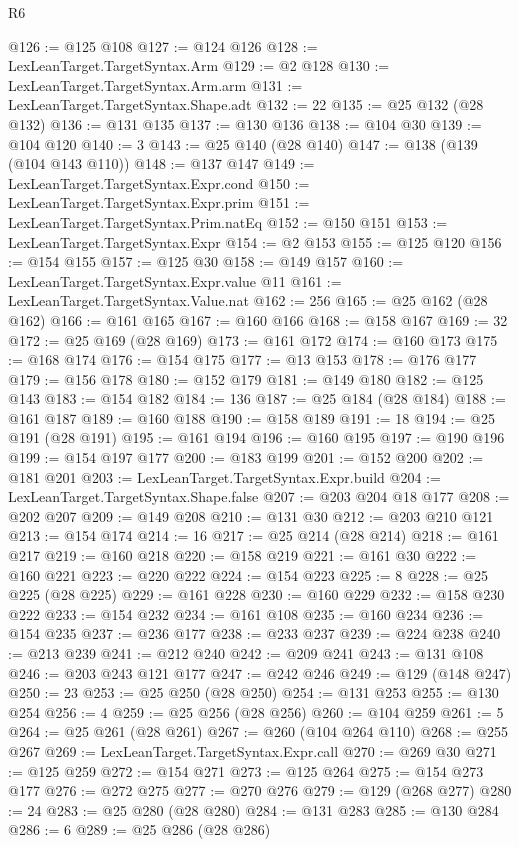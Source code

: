 \begin{lexlean}{R6}
\begin{coremodule}
@126 := @125 @108
@127 := @124 @126
@128 := LexLeanTarget.TargetSyntax.Arm
@129 := @2 @128
@130 := LexLeanTarget.TargetSyntax.Arm.arm
@131 := LexLeanTarget.TargetSyntax.Shape.adt
@132 := 22
@135 := @25 @132 (@28 @132)
@136 := @131 @135
@137 := @130 @136
@138 := @104 @30
@139 := @104 @120
@140 := 3
@143 := @25 @140 (@28 @140)
@147 := @138 (@139 (@104 @143 @110))
@148 := @137 @147
@149 := LexLeanTarget.TargetSyntax.Expr.cond
@150 := LexLeanTarget.TargetSyntax.Expr.prim
@151 := LexLeanTarget.TargetSyntax.Prim.natEq
@152 := @150 @151
@153 := LexLeanTarget.TargetSyntax.Expr
@154 := @2 @153
@155 := @125 @120
@156 := @154 @155
@157 := @125 @30
@158 := @149 @157
@160 := LexLeanTarget.TargetSyntax.Expr.value @11
@161 := LexLeanTarget.TargetSyntax.Value.nat
@162 := 256
@165 := @25 @162 (@28 @162)
@166 := @161 @165
@167 := @160 @166
@168 := @158 @167
@169 := 32
@172 := @25 @169 (@28 @169)
@173 := @161 @172
@174 := @160 @173
@175 := @168 @174
@176 := @154 @175
@177 := @13 @153
@178 := @176 @177
@179 := @156 @178
@180 := @152 @179
@181 := @149 @180
@182 := @125 @143
@183 := @154 @182
@184 := 136
@187 := @25 @184 (@28 @184)
@188 := @161 @187
@189 := @160 @188
@190 := @158 @189
@191 := 18
@194 := @25 @191 (@28 @191)
@195 := @161 @194
@196 := @160 @195
@197 := @190 @196
@199 := @154 @197 @177
@200 := @183 @199
@201 := @152 @200
@202 := @181 @201
@203 := LexLeanTarget.TargetSyntax.Expr.build
@204 := LexLeanTarget.TargetSyntax.Shape.false
@207 := @203 @204 @18 @177
@208 := @202 @207
@209 := @149 @208
@210 := @131 @30
@212 := @203 @210 @121
@213 := @154 @174
@214 := 16
@217 := @25 @214 (@28 @214)
@218 := @161 @217
@219 := @160 @218
@220 := @158 @219
@221 := @161 @30
@222 := @160 @221
@223 := @220 @222
@224 := @154 @223
@225 := 8
@228 := @25 @225 (@28 @225)
@229 := @161 @228
@230 := @160 @229
@232 := @158 @230 @222
@233 := @154 @232
@234 := @161 @108
@235 := @160 @234
@236 := @154 @235
@237 := @236 @177
@238 := @233 @237
@239 := @224 @238
@240 := @213 @239
@241 := @212 @240
@242 := @209 @241
@243 := @131 @108
@246 := @203 @243 @121 @177
@247 := @242 @246
@249 := @129 (@148 @247)
@250 := 23
@253 := @25 @250 (@28 @250)
@254 := @131 @253
@255 := @130 @254
@256 := 4
@259 := @25 @256 (@28 @256)
@260 := @104 @259
@261 := 5
@264 := @25 @261 (@28 @261)
@267 := @260 (@104 @264 @110)
@268 := @255 @267
@269 := LexLeanTarget.TargetSyntax.Expr.call
@270 := @269 @30
@271 := @125 @259
@272 := @154 @271
@273 := @125 @264
@275 := @154 @273 @177
@276 := @272 @275
@277 := @270 @276
@279 := @129 (@268 @277)
@280 := 24
@283 := @25 @280 (@28 @280)
@284 := @131 @283
@285 := @130 @284
@286 := 6
@289 := @25 @286 (@28 @286)

\end{coremodule}
\end{lexlean}
